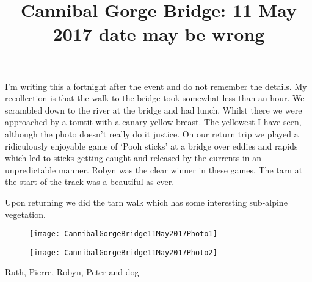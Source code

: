 \documentclass[12pt]{article} %
\title{Cannibal Gorge Bridge: 11 May 2017 \footnotesize{date may be wrong}}
\makeatletter
\renewcommand{\maketitle}{%
  {\bfseries{\scshape{\Large{\@title\par}}}}
}
\makeatother
\begin{document}
  \maketitle

I'm writing this a fortnight after the event and do not remember the details.  My recollection is that the walk to the bridge took somewhat less than an hour.  We scrambled down to the river at the bridge and had lunch.  Whilst there we were approached by a tomtit with a canary yellow breast.  The yellowest I have seen, although the photo doesn't really do it justice.  On our return trip we played a ridiculously enjoyable game of `Pooh sticks' at a bridge over eddies and rapids which led to sticks getting caught and released by the currents in an unpredictable manner.  Robyn was the clear winner in these games.  The tarn at the start of the track was a beautiful as ever.

Upon returning we did the tarn walk which has some interesting sub-alpine vegetation.

\begin{figure}[ht]
\begin{minipage}{.55\linewidth}
\begin{flushleft}
   \texttt{[image: CannibalGorgeBridge11May2017Photo1]}
\end{flushleft}
\end{minipage}
\begin{minipage}{.45\linewidth}
\begin{flushright}
    \texttt{[image: CannibalGorgeBridge11May2017Photo2]}
\end{flushright}
\end{minipage}
\end{figure}

\begin{flushright}
Ruth, Pierre, Robyn, Peter and dog
\end{flushright}
\end{document}
